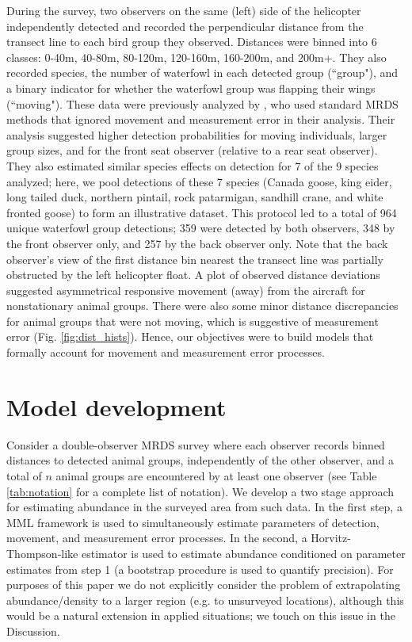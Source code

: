 \documentclass[12pt,fleqn]{article}
\begin{document}
During the survey, two observers on the same (left) side of the helicopter independently detected and recorded the perpendicular distance from the transect line to each bird group they observed.  Distances were binned into 6 classes: 0-40m, 40-80m, 80-120m, 120-160m, 160-200m, and 200m+.  They also recorded species, the number of waterfowl in each detected group (``group"), and a binary indicator for whether the waterfowl group was flapping their wings (``moving").  These data were previously analyzed by \citet{AlisauskasConn2017}, who used standard MRDS methods that ignored movement and measurement error in their analysis.  Their analysis suggested higher detection probabilities for moving individuals, larger group sizes, and for the front seat observer (relative to a rear seat observer).  They also estimated similar species effects on detection for 7 of the 9 species analyzed; here, we pool detections of these 7 species (Canada goose, king eider, long tailed duck, northern pintail, rock patarmigan, sandhill crane, and white fronted goose) to form an illustrative dataset.  This protocol led to a total of 964 unique waterfowl group detections; 359 were detected by both observers, 348 by the front observer only, and 257 by the back observer only.  Note that the back observer's view of the first distance bin nearest the transect line was partially obstructed by the left helicopter float.  A plot of observed distance deviations suggested asymmetrical responsive movement (away) from the aircraft for nonstationary animal groups.  There were also some minor distance discrepancies for animal groups that were not moving, which is suggestive of measurement error (Fig. \ref{fig:dist_hists}).  Hence, our objectives were to build models that formally account for movement and measurement error processes.

\section{Model development}


Consider a double-observer MRDS survey where each observer records binned distances to detected animal groups, independently of the other observer, and a total of $n$ animal groups are encountered by at least one observer (see Table \ref{tab:notation} for a complete list of notation).  We develop a two stage approach for estimating abundance in the surveyed area from such data.  In the first step, a MML framework is used to simultaneously estimate parameters of detection, movement, and measurement error processes.  In the second, a Horvitz-Thompson-like estimator is used to estimate abundance conditioned on parameter estimates from step 1 (a bootstrap procedure is used to quantify precision).  For purposes of this paper we do not explicitly consider the problem of extrapolating abundance/density to a larger region (e.g. to unsurveyed locations), although this would be a natural extension in applied situations; we touch on this issue in the Discussion.
\end{document}
